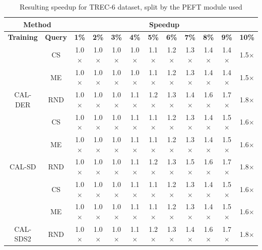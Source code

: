 \begin{table}[htbp]
\begin{subtable}{\linewidth}
\begin{tabular}{c|c|cccccccccc}
\toprule
\multicolumn{2}{c|}{\textbf{Method}} & \multicolumn{10}{c}{\textbf{Speedup}} \\
\midrule
\textbf{Training} & \textbf{Query} & \textbf{1\%} & \textbf{2\%} & \textbf{3\%} & \textbf{4\%} & \textbf{5\%} & \textbf{6\%} & \textbf{7\%} & \textbf{8\%} & \textbf{9\%} & \textbf{10\%}\\
\midrule
 & CS & 1.0$\times$ & 1.0$\times$ & 1.0$\times$ & 1.0$\times$ & 1.1$\times$ & 1.2$\times$ & 1.3$\times$ & 1.4$\times$ & 1.4$\times$ & 1.5$\times$\\

 & ME & 1.0$\times$ & 1.0$\times$ & 1.0$\times$ & 1.0$\times$ & 1.1$\times$ & 1.2$\times$ & 1.3$\times$ & 1.4$\times$ & 1.4$\times$ & 1.5$\times$\\

\multirow{-3}{*}{\raggedright\arraybackslash CAL-DER} & RND & 1.0$\times$ & 1.0$\times$ & 1.0$\times$ & 1.1$\times$ & 1.2$\times$ & 1.3$\times$ & 1.4$\times$ & 1.6$\times$ & 1.7$\times$ & 1.8$\times$\\
\midrule
 & CS & 1.0$\times$ & 1.0$\times$ & 1.0$\times$ & 1.1$\times$ & 1.1$\times$ & 1.2$\times$ & 1.3$\times$ & 1.4$\times$ & 1.5$\times$ & 1.6$\times$\\

 & ME & 1.0$\times$ & 1.0$\times$ & 1.0$\times$ & 1.1$\times$ & 1.1$\times$ & 1.2$\times$ & 1.3$\times$ & 1.4$\times$ & 1.5$\times$ & 1.6$\times$\\

\multirow{-3}{*}{\raggedright\arraybackslash CAL-SD} & RND & 1.0$\times$ & 1.0$\times$ & 1.0$\times$ & 1.1$\times$ & 1.2$\times$ & 1.3$\times$ & 1.5$\times$ & 1.6$\times$ & 1.7$\times$ & 1.8$\times$\\
\midrule
 & CS & 1.0$\times$ & 1.0$\times$ & 1.0$\times$ & 1.1$\times$ & 1.1$\times$ & 1.2$\times$ & 1.3$\times$ & 1.4$\times$ & 1.5$\times$ & 1.6$\times$\\

 & ME & 1.0$\times$ & 1.0$\times$ & 1.0$\times$ & 1.1$\times$ & 1.1$\times$ & 1.2$\times$ & 1.3$\times$ & 1.4$\times$ & 1.5$\times$ & 1.6$\times$\\

\multirow{-3}{*}{\raggedright\arraybackslash CAL-SDS2} & RND & 1.0$\times$ & 1.0$\times$ & 1.0$\times$ & 1.1$\times$ & 1.2$\times$ & 1.3$\times$ & 1.4$\times$ & 1.6$\times$ & 1.7$\times$ & 1.8$\times$\\
\bottomrule
\end{tabular}
\end{subtable}
\caption{Resulting speedup for TREC-6 dataset, split by the PEFT module used}
\label{tab:speedup_short_trec_10}
\end{table}
